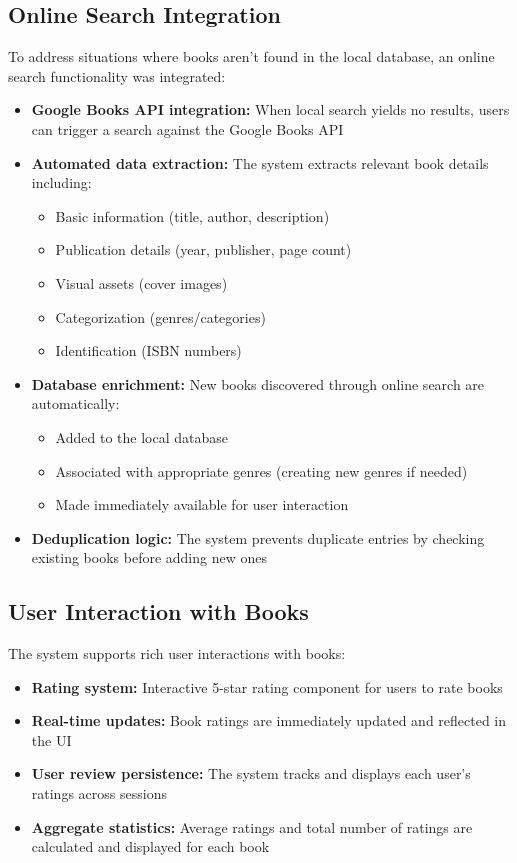 \documentclass{article}
\begin{document}
\subsection{Online Search Integration}
To address situations where books aren't found in the local database, an online search functionality was integrated:
\begin{itemize}
    \item \textbf{Google Books API integration:} When local search yields no results, users can trigger a search against the Google Books API
    \item \textbf{Automated data extraction:} The system extracts relevant book details including:
    \begin{itemize}
        \item Basic information (title, author, description)
        \item Publication details (year, publisher, page count)
        \item Visual assets (cover images)
        \item Categorization (genres/categories)
        \item Identification (ISBN numbers)
    \end{itemize}
    \item \textbf{Database enrichment:} New books discovered through online search are automatically:
    \begin{itemize}
        \item Added to the local database
        \item Associated with appropriate genres (creating new genres if needed)
        \item Made immediately available for user interaction
    \end{itemize}
    \item \textbf{Deduplication logic:} The system prevents duplicate entries by checking existing books before adding new ones
\end{itemize}

\subsection{User Interaction with Books}
The system supports rich user interactions with books:
\begin{itemize}
    \item \textbf{Rating system:} Interactive 5-star rating component for users to rate books
    \item \textbf{Real-time updates:} Book ratings are immediately updated and reflected in the UI
    \item \textbf{User review persistence:} The system tracks and displays each user's ratings across sessions
    \item \textbf{Aggregate statistics:} Average ratings and total number of ratings are calculated and displayed for each book
\end{itemize}
\end{document}
